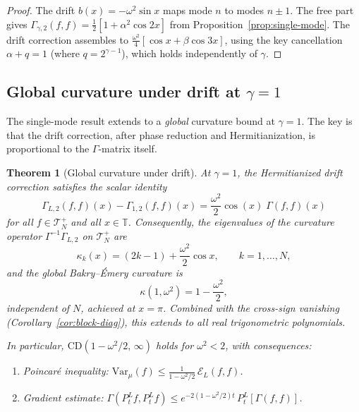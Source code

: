 \documentclass[11pt,a4paper]{article}
\theoremstyle{plain}
\newtheorem{theorem}{Theorem}[section]
\theoremstyle{definition}
\theoremstyle{remark}
\newcommand{\T}{\mathbb{T}}
\newcommand{\Var}{\mathrm{Var}}
\begin{document}
\begin{proof}
The drift $b(x) = -\omega^2\sin x$ maps mode $n$ to modes $n \pm 1$.
The free part gives
$\Gamma_{\gamma,2}(f,f) = \frac{1}{2}[1 + \alpha^2\cos 2x]$
from Proposition~\ref{prop:single-mode}.
The drift correction assembles to
$\frac{\omega^2}{4}[\cos x + \beta\cos 3x]$,
using the key cancellation $\alpha + q = 1$ (where $q = 2^{\gamma-1}$),
which holds independently of $\gamma$.
\end{proof}


\subsection{Global curvature under drift at $\gamma = 1$}

The single-mode result extends to a \emph{global}
curvature bound at $\gamma = 1$.  The key is that the
drift correction, after phase reduction and Hermitianization,
is proportional to the $\Gamma$-matrix itself.

\begin{theorem}[Global curvature under drift]\label{thm:global-drift}
At $\gamma = 1$, the Hermitianized drift correction satisfies
the scalar identity
\begin{equation}\label{eq:drift-scalar}
  \Gamma_{L,2}(f,f)(x) - \Gamma_{1,2}(f,f)(x)
  = \frac{\omega^2}{2}\cos(x)\;\Gamma(f,f)(x)
\end{equation}
for all $f \in \mathcal{T}_N^+$ and all $x \in \T$.
Consequently, the eigenvalues of the curvature operator
$\Gamma^{-1}\Gamma_{L,2}$ on $\mathcal{T}_N^+$ are
\begin{equation}\label{eq:drift-eigenvalues}
  \kappa_k(x) = (2k-1) + \frac{\omega^2}{2}\cos x,
  \qquad k = 1,\ldots,N,
\end{equation}
and the global Bakry--\'Emery curvature is
\begin{equation}\label{eq:global-kappa}
  \kappa(1,\omega^2) = 1 - \frac{\omega^2}{2},
\end{equation}
independent of $N$, achieved at $x = \pi$.
Combined with the cross-sign vanishing
(Corollary~\ref{cor:block-diag}), this extends to all real
trigonometric polynomials.

In particular, $\mathrm{CD}(1-\omega^2/2,\,\infty)$ holds for
$\omega^2 < 2$, with consequences:
\begin{enumerate}[label=(\roman*)]
\item Poincar\'e inequality:
  $\Var_\mu(f) \leq \frac{1}{1-\omega^2/2}\,\mathcal{E}_L(f,f)$.
\item Gradient estimate:
  $\Gamma(P_t^L f, P_t^L f)
  \leq e^{-2(1-\omega^2/2)t}\,P_t^L[\Gamma(f,f)]$.
\end{enumerate}
\end{theorem}
\end{document}
